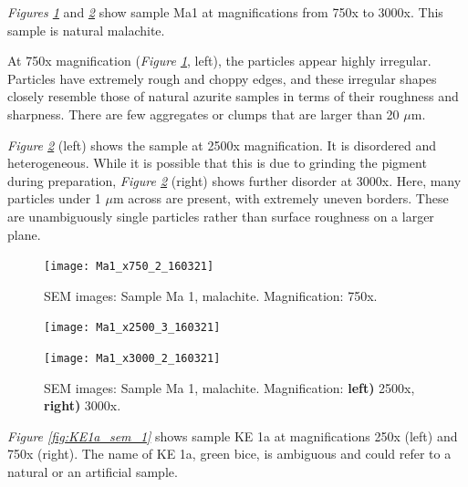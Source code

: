 
\textit{Figures \ref{fig:Ma1_sem_1}} and \textit{\ref{fig:Ma1_sem_2}} show sample Ma1 at magnifications from 750x to 3000x. This sample is natural malachite.

At 750x magnification (\textit{Figure \ref{fig:Ma1_sem_1}}, left), the particles appear highly irregular. Particles have extremely rough and choppy edges, and these irregular shapes closely resemble those of natural azurite samples in terms of their roughness and sharpness. There are few aggregates or clumps that are larger than 20 $\mu$m.  

\textit{Figure \ref{fig:Ma1_sem_2}} (left) shows the sample at 2500x magnification. It is disordered and heterogeneous. While it is possible that this is due to grinding the pigment during preparation, \textit{Figure \ref{fig:Ma1_sem_2}} (right) shows further disorder at 3000x. Here, many particles under 1 $\mu$m across are present, with extremely uneven borders. These are unambiguously single particles rather than surface roughness on a larger plane.

\begin{figure}[H]
\centering
\texttt{[image: Ma1\_x750\_2\_160321]}
\caption[SEM images: Sample Ma 1, malachite]{SEM images: Sample Ma 1, malachite. Magnification: 750x.}
\label{fig:Ma1_sem_1}
\end{figure}

\begin{figure}[H]
\centering
\begin{minipage}{.45\textwidth}
  \centering
  \texttt{[image: Ma1\_x2500\_3\_160321]}
\end{minipage}
\begin{minipage}{.45\textwidth}
  \centering
  \texttt{[image: Ma1\_x3000\_2\_160321]}
\end{minipage}
\caption[SEM images: Sample Ma 1, malachite]{SEM images: Sample Ma 1, malachite. Magnification: \textbf{left)} 2500x, \textbf{right)} 3000x.}
\label{fig:Ma1_sem_2}
\end{figure}


\textit{Figure \ref{fig:KE1a_sem_1}} shows sample KE 1a at magnifications 250x (left) and 750x (right). The name of KE 1a, green bice, is ambiguous and could refer to a natural or an artificial sample.

